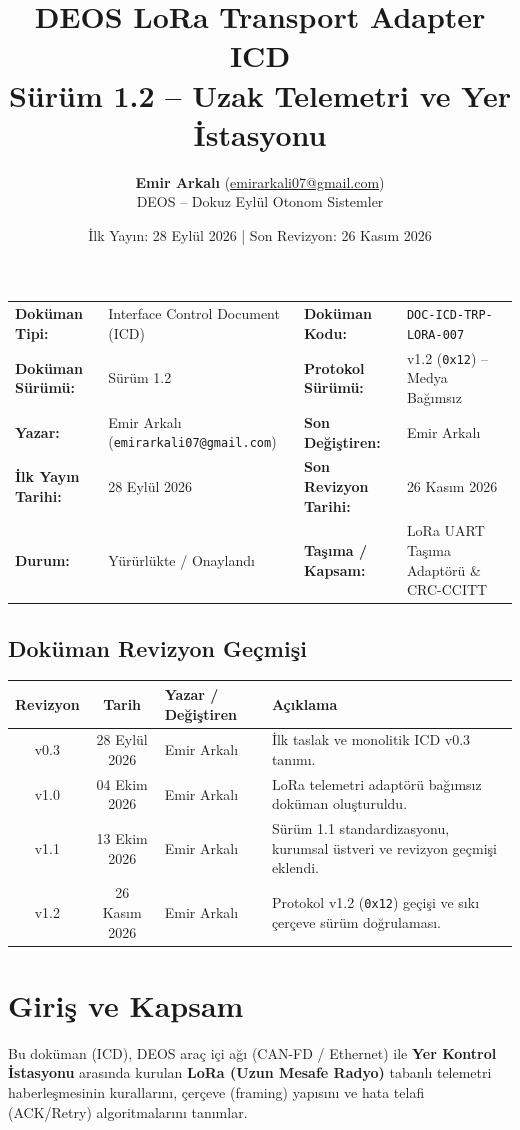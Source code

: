 \documentclass[a4paper,10pt]{article}
\title{\textbf{DEOS LoRa Transport Adapter ICD}\\
\large Sürüm 1.2 -- Uzak Telemetri ve Yer İstasyonu}
\author{\textbf{Emir Arkalı} (\href{mailto:emirarkali07@gmail.com}{emirarkali07@gmail.com})\\DEOS -- Dokuz Eylül Otonom Sistemler}
\date{İlk Yayın: 28 Eylül 2026 \quad | \quad Son Revizyon: 26 Kasım 2026}
\newcommand{\hex}[1]{\texttt{0x#1}}
\newcommand{\code}[1]{\texttt{#1}}
\begin{document}
\maketitle

\begin{center}
\small
\begin{tabularx}{\textwidth}{ll lX}
\toprule
\textbf{Doküman Tipi:} & Interface Control Document (ICD) & \textbf{Doküman Kodu:} & \code{DOC-ICD-TRP-LORA-007} \\
\textbf{Doküman Sürümü:} & Sürüm 1.2 & \textbf{Protokol Sürümü:} & v1.2 (\hex{12}) -- Medya Bağımsız \\
\textbf{Yazar:} & Emir Arkalı (\texttt{emirarkali07@gmail.com}) & \textbf{Son Değiştiren:} & Emir Arkalı \\
\textbf{İlk Yayın Tarihi:} & 28 Eylül 2026 & \textbf{Son Revizyon Tarihi:} & 26 Kasım 2026 \\
\textbf{Durum:} & Yürürlükte / Onaylandı & \textbf{Taşıma / Kapsam:} & LoRa UART Taşıma Adaptörü \& CRC-CCITT \\
\bottomrule
\end{tabularx}
\end{center}

\subsection*{Doküman Revizyon Geçmişi}
\begin{center}
\small
\begin{tabularx}{\textwidth}{c c l X}
\toprule
\textbf{Revizyon} & \textbf{Tarih} & \textbf{Yazar / Değiştiren} & \textbf{Açıklama} \\
\midrule
v0.3 & 28 Eylül 2026 & Emir Arkalı & İlk taslak ve monolitik ICD v0.3 tanımı. \\
v1.0 & 04 Ekim 2026 & Emir Arkalı & LoRa telemetri adaptörü bağımsız doküman oluşturuldu. \\
v1.1 & 13 Ekim 2026 & Emir Arkalı & Sürüm 1.1 standardizasyonu, kurumsal üstveri ve revizyon geçmişi eklendi. \\
v1.2 & 26 Kasım 2026 & Emir Arkalı & Protokol v1.2 (\hex{12}) geçişi ve sıkı çerçeve sürüm doğrulaması. \\
\bottomrule
\end{tabularx}
\end{center}
\vspace{0.8em}

\section{Giriş ve Kapsam}
Bu doküman (ICD), DEOS araç içi ağı (CAN-FD / Ethernet) ile \textbf{Yer Kontrol İstasyonu} arasında kurulan \textbf{LoRa (Uzun Mesafe Radyo)} tabanlı telemetri haberleşmesinin kurallarını, çerçeve (framing) yapısını ve hata telafi (ACK/Retry) algoritmalarını tanımlar.
\end{document}
